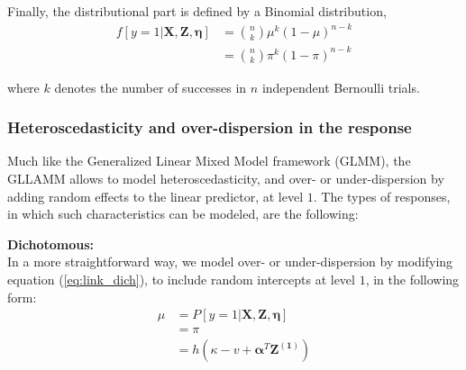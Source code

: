 	Finally, the distributional part is defined by a Binomial distribution,
	\begin{equation} \label{eq:dist_dich}
		\begin{split}
		f[y=1 | \mathbf{X}, \mathbf{Z}, \pmb{\eta}] &= \binom{n}{k} \mu^{k} (1-\mu)^{n-k} \\
		&= \binom{n}{k} \pi^{k} (1-\pi)^{n-k}
		\end{split}
	\end{equation}

	where $k$ denotes the number of successes in $n$ independent Bernoulli trials.
	



\subsubsection{Heteroscedasticity and over-dispersion in the response} \label{ss_sect:het}

Much like the Generalized Linear Mixed Model framework (GLMM), the GLLAMM allows to model heteroscedasticity, and over- or under-dispersion by adding random effects to the linear predictor, at level $1$. The types of responses, in which such characteristics can be modeled, are the following:
	
\textbf{Dichotomous:} \\
	In a more straightforward way, we model over- or under-dispersion by modifying equation (\ref{eq:link_dich}), to include random intercepts at level $1$, in the following form:
	\begin{equation} \label{eq:link_dich1}
		\begin{split}
			\mu &= P[y=1 | \mathbf{X}, \mathbf{Z}, \pmb{\eta}] \\
			&= \pi \\
			&= h(\kappa - v + \pmb{\alpha}^{T}\mathbf{Z^{(1)}})
		\end{split}	
	\end{equation}
	
	


